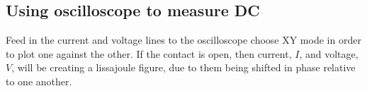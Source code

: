   \subsection{Using oscilloscope to measure DC}
  Feed in the current and voltage lines  to the oscilloscope \ira choose XY mode
  in order to plot one against the other.  If the contact is open, then current,
  $ I $, and  voltage, $ V $, will be creating a  lissajoule figure, due to them
  being shifted in phase relative to one another.


  \newpage


